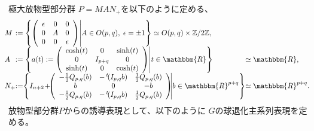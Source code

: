 \documentclass[notheorems]{beamer}
\newcommand{\assign}{:=}
\theoremstyle{definition}
\theoremstyle{example}
\theoremstyle{remark}
\theoremstyle{mystyle}
\begin{document}
\begin{frame}
極大放物型部分群
$P=MAN_{+}$を以下のように定める、
  \begin{equation*}
	  \kern-0.2cm
	  \begin{array}{@{}l@{}l@{}l@{}}
   M &\assign {\left\{ \left( \begin{array}{ccc}
    \epsilon & 0 & 0\\
    0 & A & 0\\
    0 & 0 & \epsilon
  \end{array} \right) \middle| 
    A \in O (p, q),\;
    \epsilon = \pm 1
  \right\}}\simeq O(p,q)\times \Z/{2\Z},  &\\
  A &\assign \left\{a(t)\assign\left( \begin{array}{ccc}
    \cosh (t) & 0 & \sinh (t)\\
    0 & I_{p + q} & 0\\
    \sinh (t) & 0 & \cosh (t)
  \end{array} \right)\middle| t \in \mathbbm{R}\right\} &\simeq \mathbbm{R},\\
   N_+ &\assign\kern-0.1cm\left\{  I_{n + 2}\kern-0.05cm+\kern-0.15cm\left( \begin{array}{ccc}
    - \frac{1}{2} Q_{p,q} (b) & - \,^t \! (I_{p, q} b) & \frac{1}{2} Q_{p,q} (b)\\
    b & 0 & - b\\
    - \frac{1}{2} Q_{p,q} (b) & - \,^t \! (I_{p, q} b) & \frac{1}{2} Q_{p,q} (b)
  \end{array} \right) \kern-0.1cm\middle| b \in \mathbbm{R}^{p + q} \right\} &\simeq
  \mathbbm{R}^{p + q}.\\
  \end{array}
  \end{equation*}
放物型部分群$P$からの誘導表現として、以下のように
$G$の球退化主系列表現を定める。
\end{frame}
\end{document}

